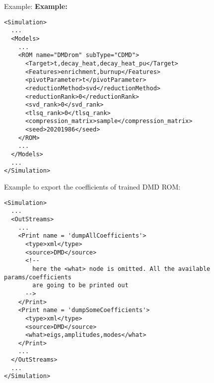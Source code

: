 \hspace{24pt}
Example:
\textbf{Example:}
\begin{lstlisting}[style=XML,morekeywords={name,subType}]
<Simulation>
  ...
  <Models>
    ...
    <ROM name="DMDrom" subType="CDMD">
      <Target>t,decay_heat,decay_heat_pu</Target>
      <Features>enrichment,burnup</Features>
      <pivotParameter>t</pivotParameter>
      <reductionMethod>svd</reductionMethod>
      <reductionRank>0</reductionRank>
      <svd_rank>0</svd_rank>
      <tlsq_rank>0</tlsq_rank>
      <compression_matrix>sample</compression_matrix>
      <seed>20201986</seed>
    </ROM>
    ...
  </Models>
  ...
</Simulation>
\end{lstlisting}

Example to export the coefficients of trained DMD ROM:
\begin{lstlisting}[style=XML,morekeywords={name,subType}]
<Simulation>
  ...
  <OutStreams>
    ...
    <Print name = 'dumpAllCoefficients'>
      <type>xml</type>
      <source>DMD</source>
      <!--
        here the <what> node is omitted. All the available params/coefficients
        are going to be printed out
      -->
    </Print>
    <Print name = 'dumpSomeCoefficients'>
      <type>xml</type>
      <source>DMD</source>
      <what>eigs,amplitudes,modes</what>
    </Print>
    ...
  </OutStreams>
  ...
</Simulation>
\end{lstlisting}


